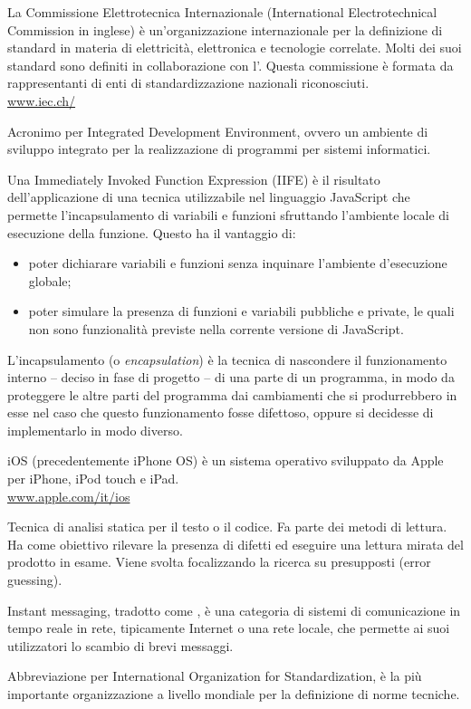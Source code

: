 La Commissione Elettrotecnica Internazionale (International Electrotechnical Commission in inglese) è un'organizzazione internazionale per la definizione di standard in materia di elettricità, elettronica e tecnologie correlate. Molti dei suoi standard sono definiti in collaborazione con l'. Questa commissione è formata da rappresentanti di enti di standardizzazione nazionali riconosciuti.\\
\url{www.iec.ch/}

Acronimo per Integrated Development Environment, ovvero un ambiente di sviluppo integrato per la realizzazione di programmi per sistemi informatici.

Una Immediately Invoked Function Expression (IIFE) è il risultato dell'applicazione di una tecnica utilizzabile nel linguaggio JavaScript che permette l'incapsulamento di variabili e funzioni sfruttando l'ambiente locale di esecuzione della funzione. Questo ha il vantaggio di:
\begin{itemize}
  \item poter dichiarare variabili e funzioni senza inquinare l'ambiente d'esecuzione globale; 
  \item poter simulare la presenza di funzioni e variabili pubbliche e private, le quali non sono funzionalità previste nella corrente versione di JavaScript.
\end{itemize}

L'incapsulamento (o \textit{encapsulation}) è la tecnica di nascondere il funzionamento interno – deciso in fase di progetto – di una parte di un programma, in modo da proteggere le altre parti del programma dai cambiamenti che si produrrebbero in esse nel caso che questo funzionamento fosse difettoso, oppure si decidesse di implementarlo in modo diverso.

iOS (precedentemente iPhone OS) è un sistema operativo sviluppato da Apple per iPhone, iPod touch e iPad.\\
\url{www.apple.com/it/ios}

Tecnica di analisi statica per il testo o il codice. Fa parte dei metodi di lettura. Ha come obiettivo rilevare la presenza di difetti ed eseguire una lettura mirata del prodotto in esame. Viene svolta focalizzando la ricerca su presupposti (error guessing).

Instant messaging, tradotto come , è una categoria di sistemi di comunicazione in tempo reale in rete, tipicamente Internet o una rete locale, che permette ai suoi utilizzatori lo scambio di brevi messaggi.

Abbreviazione per International Organization for Standardization, è la più importante organizzazione a livello mondiale per la definizione di norme tecniche.
\clearpage
